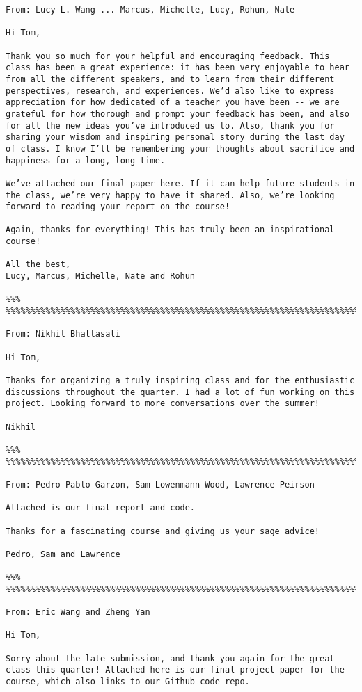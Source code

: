 \documentclass[letterpaper,12pt]{article}
\begin{document}
\begin{verbatim}
From: Lucy L. Wang ... Marcus, Michelle, Lucy, Rohun, Nate 

Hi Tom,

Thank you so much for your helpful and encouraging feedback. This class has been a great experience: it has been very enjoyable to hear from all the different speakers, and to learn from their different perspectives, research, and experiences. We’d also like to express appreciation for how dedicated of a teacher you have been -- we are grateful for how thorough and prompt your feedback has been, and also for all the new ideas you’ve introduced us to. Also, thank you for sharing your wisdom and inspiring personal story during the last day of class. I know I’ll be remembering your thoughts about sacrifice and happiness for a long, long time. 

We’ve attached our final paper here. If it can help future students in the class, we’re very happy to have it shared. Also, we’re looking forward to reading your report on the course! 

Again, thanks for everything! This has truly been an inspirational course!

All the best,
Lucy, Marcus, Michelle, Nate and Rohun

%%% %%%%%%%%%%%%%%%%%%%%%%%%%%%%%%%%%%%%%%%%%%%%%%%%%%%%%%%%%%%%%%%%%%%%%%%%%%%%

From: Nikhil Bhattasali

Hi Tom,

Thanks for organizing a truly inspiring class and for the enthusiastic discussions throughout the quarter. I had a lot of fun working on this project. Looking forward to more conversations over the summer!

Nikhil

%%% %%%%%%%%%%%%%%%%%%%%%%%%%%%%%%%%%%%%%%%%%%%%%%%%%%%%%%%%%%%%%%%%%%%%%%%%%%%%

From: Pedro Pablo Garzon, Sam Lowenmann Wood, Lawrence Peirson

Attached is our final report and code.

Thanks for a fascinating course and giving us your sage advice!

Pedro, Sam and Lawrence

%%% %%%%%%%%%%%%%%%%%%%%%%%%%%%%%%%%%%%%%%%%%%%%%%%%%%%%%%%%%%%%%%%%%%%%%%%%%%%%

From: Eric Wang and Zheng Yan

Hi Tom,

Sorry about the late submission, and thank you again for the great class this quarter! Attached here is our final project paper for the course, which also links to our Github code repo. 


\end{verbatim}
\end{document}
